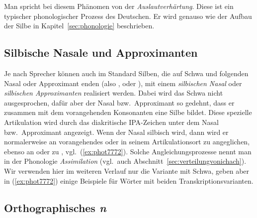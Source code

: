 Man spricht bei diesem Phänomen von der \textit{Auslautverhärtung}.
Diese ist ein typischer phonologischer Prozess des Deutschen.
Er wird genauso wie der Aufbau der Silbe in Kapitel~\ref{sec:phonologie} beschrieben.

\subsection{Silbische Nasale und Approximanten}

\label{sec:silbischenasaleapproximanten}

Je nach Sprecher können auch im Standard Silben, die auf Schwa und folgenden Nasal oder Approximant enden (also \textipa{[@n]}, \textipa{[@m]} oder \textipa{[@l]}), mit einem \textit{silbischen Nasal} oder \textit{silbischen Approximanten} realisiert werden.
Dabei wird das Schwa nicht ausgesprochen, dafür aber der Nasal bzw.\ Approximant so gedehnt, dass er zusammen mit dem vorangehenden Konsonanten eine Silbe bildet.
Diese spezielle Artikulation wird durch das diakritische IPA-Zeichen \textipa{[\s{ }]} unter dem Nasal bzw.\ Approximant angezeigt.
Wenn der Nasal \textipa{[n]} silbisch wird, dann wird er normalerweise an vorangehendes \textipa{[b]} oder \textipa{[p]} in seinem Artikulationsort zu \textipa{[m]} angeglichen, ebenso an \textipa{[g]} oder \textipa{[k]} zu \textipa{[N]}, vgl.\ (\ref{ex:phot7772}).
Solche Angleichungsprozesse nennt man in der Phonologie \textit{Assimilation} (vgl.\ auch Abschnitt~\ref{sec:verteilungvonichach}).
Wir verwenden hier im weiteren Verlauf nur die Variante mit Schwa, geben aber in (\ref{ex:phot7772}) einige Beispiele für Wörter mit beiden Transkriptionsvarianten.

\begin{exe}
  \ex\label{ex:phot7772}
  \begin{xlist}
  \end{xlist}
\end{exe}

\subsection{Orthographisches \textit{n}}

\label{sec:orthographischesn}

